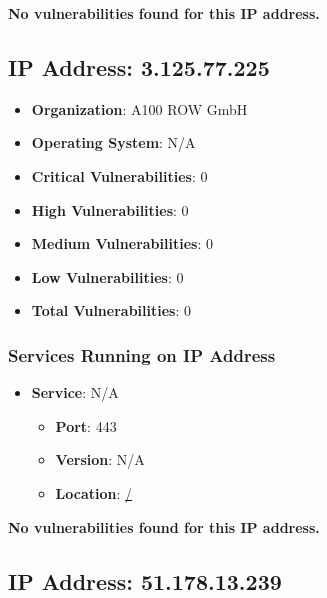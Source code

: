 \documentclass{article}
\begin{document}
\textbf{No vulnerabilities found for this IP address.}




\clearpage



\subsection*{IP Address: 3.125.77.225}

\begin{itemize}
    \item \textbf{Organization}: A100 ROW GmbH
    \item \textbf{Operating System}:  N/A 
    \item \textbf{Critical Vulnerabilities}: 0
    \item \textbf{High Vulnerabilities}: 0
    \item \textbf{Medium Vulnerabilities}: 0
    \item \textbf{Low Vulnerabilities}: 0
    \item \textbf{Total Vulnerabilities}: 0
\end{itemize}

\subsubsection*{Services Running on IP Address}

\begin{itemize}
    
        \item \textbf{Service}: N/A
        \begin{itemize}
            \item \textbf{Port}: 443
            \item \textbf{Version}:  N/A 
            \item \textbf{Location}: \href{ / }{ / }
        \end{itemize}
    
\end{itemize}


\textbf{No vulnerabilities found for this IP address.}




\clearpage



\subsection*{IP Address: 51.178.13.239}
\end{document}
